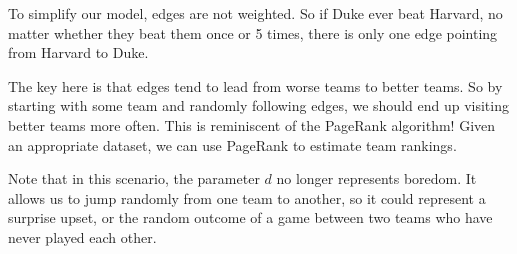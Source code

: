 To simplify our model, edges are not weighted. So if Duke ever beat Harvard, no matter whether they beat them once or 5 times, there is only one edge pointing from Harvard to Duke.

The key here is that edges tend to lead from worse teams to better teams.
So by starting with some team and randomly following edges, we should end up visiting better teams more often.
This is reminiscent of the PageRank algorithm! Given an appropriate dataset, we can use PageRank to estimate team rankings.

Note that in this scenario, the parameter $d$ no longer represents boredom.
It allows us to jump randomly from one team to another, so it could represent a surprise upset, or the random outcome of a game between two teams who have never played each other.

